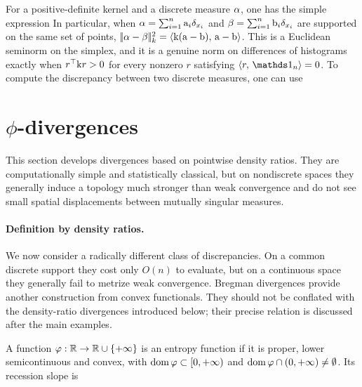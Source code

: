 For a positive-definite kernel and a discrete measure $\alpha$, one has the simple expression
In particular, when $\alpha=\sum_{i=1}^n \mathrm{a}_i \delta_{x_i}$ and $\beta=\sum_{i=1}^n \mathrm{b}_i \delta_{x_i}$ are supported on the same set of points, $|\!| \alpha-\beta |\!|_{k}^2 = \langle \mathrm{k}(\mathrm{a}-\mathrm{b}),\,\mathrm{a}-\mathrm{b}\rangle$. This is a Euclidean seminorm on the simplex, and it is a genuine norm on differences of histograms exactly when $r^\top\mathrm{k} r>0$ for every nonzero $r$ satisfying $\dotp{r}{\ones_n}=0$.
%
To compute the discrepancy between two discrete measures, one can use

\section[phi-divergences]{$\phi$-divergences}
\label{sec-phi-div}


This section develops divergences based on pointwise density ratios. They are computationally simple and statistically classical, but on nondiscrete spaces they generally induce a topology much stronger than weak convergence and do not see small spatial displacements between mutually singular measures.

\paragraph{Definition by density ratios.}

We now consider a radically different class of discrepancies. On a common discrete support they cost only $O(n)$ to evaluate, but on a continuous space they generally fail to metrize weak convergence.
%
Bregman divergences provide another construction from convex functionals. They should not be conflated with the density-ratio divergences introduced below; their precise relation is discussed after the main examples.

\begin{defn}
\label{def_entropy}
A function $\varphi : \mathbb{R} \to \mathbb{R} \cup \{+\infty\}$ is an entropy function if it is proper, lower semicontinuous and convex, with $\operatorname{dom} \varphi\subset [0,+\infty)$ and $\operatorname{dom} \varphi \cap (0,+\infty) \neq \emptyset$. Its recession slope is
\end{defn}

